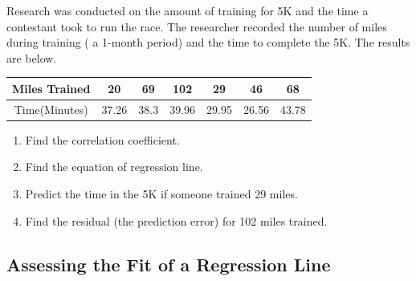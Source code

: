 \vspace*{3\baselineskip}

\begin{exercise}
Research was conducted on the amount of training for 5K and the time a
contestant took to run the race. The researcher recorded the number of
miles during training ( a 1-month period) and the time to complete the
5K. The results are below.

\begin{longtable}[]{@{}ccccccc@{}}
\toprule()
Miles Trained & 20 & 69 & 102 & 29 & 46 & 68 \\
\midrule()
\endhead
Time(Minutes) & 37.26 & 38.3 & 39.96 & 29.95 & 26.56 & 43.78 \\
\bottomrule()
\end{longtable}
\begin{enumerate}
\item
  Find the correlation coefficient.
\item
  Find the equation of regression line.
\item
  Predict the time in the 5K if someone trained 29 miles.
\item
  Find the residual (the prediction error) for 102 miles trained.
\end{enumerate}

\end{exercise}

\hypertarget{assessing-the-fit-of-a-regression-line}{%
\subsection{Assessing the Fit of a Regression
Line}\label{assessing-the-fit-of-a-regression-line}}

